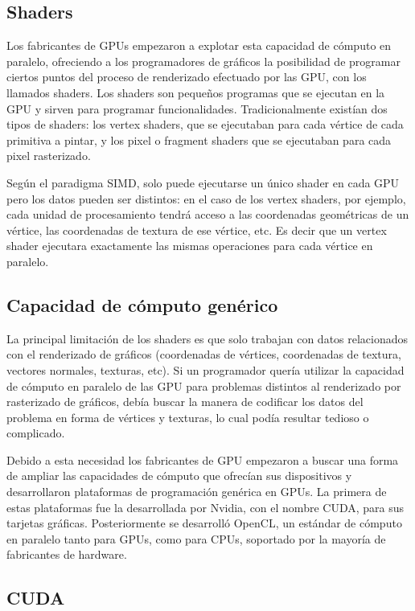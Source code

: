 \subsection{Shaders}

Los fabricantes de GPUs empezaron a explotar esta capacidad de cómputo en paralelo, ofreciendo a los programadores de gráficos la posibilidad de programar ciertos puntos del proceso de renderizado efectuado por las GPU, con los llamados shaders. Los shaders son pequeños programas que se ejecutan en la GPU y sirven para programar funcionalidades. Tradicionalmente existían dos tipos de shaders: los vertex shaders, que se ejecutaban para cada vértice de cada primitiva a pintar, y los pixel o fragment shaders que se ejecutaban para cada pixel rasterizado.

\medskip
Según el paradigma SIMD, solo puede ejecutarse un único shader en cada GPU pero los datos pueden ser distintos: en el caso de los vertex shaders, por ejemplo, cada unidad de procesamiento tendrá acceso a las coordenadas geométricas de un vértice, las coordenadas de textura de ese vértice, etc. Es decir que un vertex shader ejecutara exactamente las mismas operaciones para cada vértice en paralelo. 

\clearpage

\subsection{Capacidad de cómputo genérico}
La principal limitación de los shaders es que solo trabajan con datos relacionados con el renderizado de gráficos (coordenadas de vértices, coordenadas de textura, vectores normales, texturas, etc). Si un programador quería utilizar la capacidad de cómputo en paralelo de las GPU para problemas distintos al renderizado por rasterizado de gráficos, debía buscar la manera de codificar los datos del problema en forma de vértices y texturas, lo cual podía resultar tedioso o complicado.

\medskip
Debido a esta necesidad los fabricantes de GPU empezaron a buscar una forma de ampliar las capacidades de cómputo que ofrecían sus dispositivos y desarrollaron plataformas de programación genérica en GPUs. La primera de estas plataformas fue la desarrollada por Nvidia, con el nombre CUDA, para sus tarjetas gráficas. Posteriormente se desarrolló OpenCL, un estándar de cómputo en paralelo tanto para GPUs, como para CPUs, soportado por la mayoría de fabricantes de hardware.

\subsection{CUDA}

